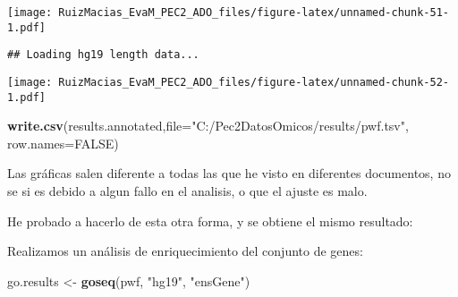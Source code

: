 \documentclass[
]{article}
\newenvironment{Shaded}{\begin{snugshade}}{\end{snugshade}}
\newcommand{\DataTypeTok}[1]{\textcolor[rgb]{0.13,0.29,0.53}{#1}}
\newcommand{\DecValTok}[1]{\textcolor[rgb]{0.00,0.00,0.81}{#1}}
\newcommand{\KeywordTok}[1]{\textcolor[rgb]{0.13,0.29,0.53}{\textbf{#1}}}
\newcommand{\NormalTok}[1]{#1}
\newcommand{\OperatorTok}[1]{\textcolor[rgb]{0.81,0.36,0.00}{\textbf{#1}}}
\newcommand{\OtherTok}[1]{\textcolor[rgb]{0.56,0.35,0.01}{#1}}
\newcommand{\StringTok}[1]{\textcolor[rgb]{0.31,0.60,0.02}{#1}}
\begin{document}
\texttt{[image: RuizMacias\_EvaM\_PEC2\_ADO\_files/figure-latex/unnamed-chunk-51-1.pdf]}

\begin{verbatim}
## Loading hg19 length data...
\end{verbatim}

\texttt{[image: RuizMacias\_EvaM\_PEC2\_ADO\_files/figure-latex/unnamed-chunk-52-1.pdf]}

\begin{Shaded}
\begin{Highlighting}[]
\KeywordTok{write.csv}\NormalTok{(results.annotated,}\DataTypeTok{file=}\StringTok{"C:/Pec2DatosOmicos/results/pwf.tsv"}\NormalTok{,}
          \DataTypeTok{row.names=}\OtherTok{FALSE}\NormalTok{)}
\end{Highlighting}
\end{Shaded}

Las gráficas salen diferente a todas las que he visto en diferentes
documentos, no se si es debido a algun fallo en el analisis, o que el
ajuste es malo.

He probado a hacerlo de esta otra forma, y se obtiene el mismo
resultado:

\begin{Shaded}
\end{Shaded}

Realizamos un análisis de enriquecimiento del conjunto de genes:

\begin{Shaded}
\begin{Highlighting}[]
\NormalTok{go.results <-}\StringTok{ }\KeywordTok{goseq}\NormalTok{(pwf, }\StringTok{"hg19"}\NormalTok{, }\StringTok{"ensGene"}\NormalTok{)}
\end{Highlighting}
\end{Shaded}
\end{document}
